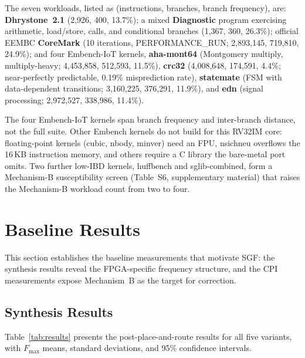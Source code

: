 \documentclass[acmsmall,nonacm,screen]{acmart}
\begin{document}
The seven workloads, listed as (instructions, branches, branch frequency), are: \textbf{Dhrystone~2.1} \cite{hennessy2017computer} (2{,}926, 400, 13.7\%); a mixed \textbf{Diagnostic} program exercising arithmetic, load/store, calls, and conditional branches (1{,}367, 360, 26.3\%); official EEMBC \textbf{CoreMark} \cite{coremark} (10 iterations, PERFORMANCE\_RUN; 2{,}893{,}145, 719{,}810, 24.9\%); and four Embench-IoT \cite{embench2019} kernels, \textbf{aha-mont64} (Montgomery multiply, multiply-heavy; 4{,}453{,}858, 512{,}593, 11.5\%), \textbf{crc32} (4{,}008{,}648, 174{,}591, 4.4\%; near-perfectly predictable, 0.19\% misprediction rate), \textbf{statemate} (FSM with data-dependent transitions; 3{,}160{,}225, 376{,}291, 11.9\%), and \textbf{edn} (signal processing; 2{,}972{,}527, 338{,}986, 11.4\%).

The four Embench-IoT kernels span branch frequency and inter-branch distance, not the full suite. Other Embench kernels do not build for this RV32IM core: floating-point kernels (cubic, nbody, minver) need an FPU, nsichneu overflows the 16\,KB instruction memory, and others require a C library the bare-metal port omits. Two further low-IBD kernels, huffbench and sglib-combined, form a Mechanism-B susceptibility screen (Table~S6, supplementary material) that raises the Mechanism-B workload count from two to four.

\section{Baseline Results}
\label{sec:results}

This section establishes the baseline measurements that motivate SGF: the synthesis results reveal the FPGA-specific frequency structure, and the CPI measurements expose Mechanism~B as the target for correction.

\subsection{Synthesis Results}
\label{sec:synth}

Table~\ref{tab:results} presents the post-place-and-route results for all five variants, with $F_{\max}$ means, standard deviations, and 95\% confidence intervals.
\end{document}
